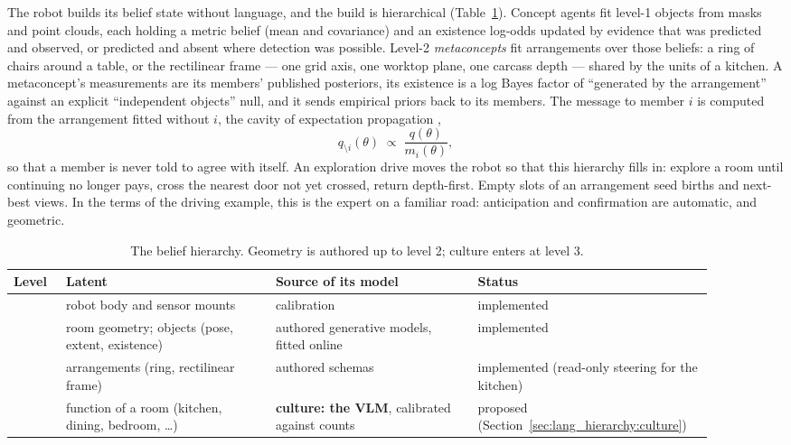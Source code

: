 The robot builds its belief state without language, and the build is hierarchical (Table~\ref{tab:lh_levels}).
Concept agents fit level-1 objects from masks and point clouds, each holding a metric belief (mean and covariance)
and an existence log-odds updated by evidence that was predicted and observed, or predicted and absent where
detection was possible. Level-2 \emph{metaconcepts} fit arrangements over those beliefs: a ring of chairs around a
table, or the rectilinear frame --- one grid axis, one worktop plane, one carcass depth --- shared by the units of a
kitchen. A metaconcept's measurements are its members' published posteriors, its existence is a log Bayes factor of
``generated by the arrangement'' against an explicit ``independent objects'' null, and it sends empirical priors
back to its members. The message to member $i$ is computed from the arrangement fitted without $i$, the cavity of
expectation propagation \cite{minka2001expectation},
\begin{equation}
    q_{\setminus i}(\theta) \;\propto\; \frac{q(\theta)}{m_i(\theta)},
    \label{eq:lh_cavity}
\end{equation}
so that a member is never told to agree with itself. An exploration drive moves the robot so that this hierarchy
fills in: explore a room until continuing no longer pays, cross the nearest door not yet crossed, return depth-first.
Empty slots of an arrangement seed births and next-best views. In the terms of the driving example, this is the
expert on a familiar road: anticipation and confirmation are automatic, and geometric.

\begin{table}[ht]
    \centering
    \small
    \begin{tabular}{|>{\raggedright\arraybackslash}p{0.07\linewidth}|>{\raggedright\arraybackslash}p{0.28\linewidth}|>{\raggedright\arraybackslash}p{0.27\linewidth}|>{\raggedright\arraybackslash}p{0.28\linewidth}|}
        \hline
        \textbf{Level} & \textbf{Latent} & \textbf{Source of its model} & \textbf{Status} \\ \hline
        0 & robot body and sensor mounts & calibration & implemented \\ \hline
        1 & room geometry; objects (pose, extent, existence) & authored generative models, fitted online & implemented \\ \hline
        2 & arrangements (ring, rectilinear frame) & authored schemas & implemented (read-only steering for the kitchen) \\ \hline
        3 & function of a room (kitchen, dining, bedroom, \ldots) & \textbf{culture: the VLM}, calibrated against counts & proposed (Section~\ref{sec:lang_hierarchy:culture}) \\ \hline
    \end{tabular}
    \caption{The belief hierarchy. Geometry is authored up to level 2; culture enters at level 3.}
    \label{tab:lh_levels}
\end{table}

